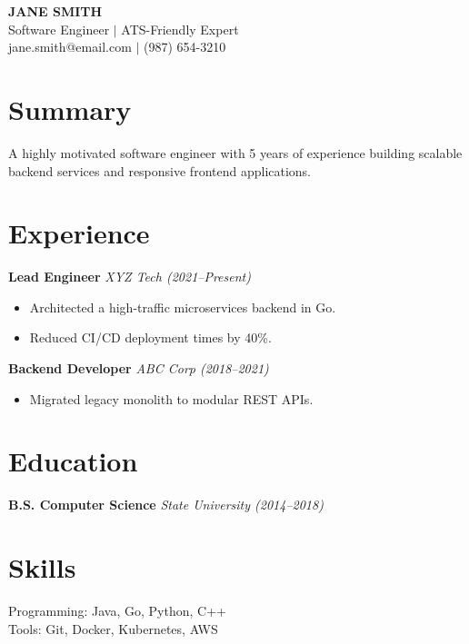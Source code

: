 \documentclass[10pt, letterpaper]{article}
\begin{document}
\begin{center}
    {\huge \textbf{JANE SMITH}} \\
    \vspace{2mm}
    Software Engineer $|$ ATS-Friendly Expert \\
    jane.smith@email.com $|$ (987) 654-3210
\end{center}

\section{Summary}
A highly motivated software engineer with 5 years of experience building scalable backend services and responsive frontend applications.

\section{Experience}
\textbf{Lead Engineer} \hfill \textit{XYZ Tech (2021--Present)}
\begin{itemize}[leftmargin=*]
    \setlength\itemsep{-0.5em}
    \item Architected a high-traffic microservices backend in Go.
    \item Reduced CI/CD deployment times by 40\%.
\end{itemize}

\vspace{5pt}
\textbf{Backend Developer} \hfill \textit{ABC Corp (2018--2021)}
\begin{itemize}[leftmargin=*]
    \setlength\itemsep{-0.5em}
    \item Migrated legacy monolith to modular REST APIs.
\end{itemize}

\section{Education}
\textbf{B.S. Computer Science} \hfill \textit{State University (2014--2018)}

\section{Skills}
Programming: Java, Go, Python, C++ \\
Tools: Git, Docker, Kubernetes, AWS
\end{document}
